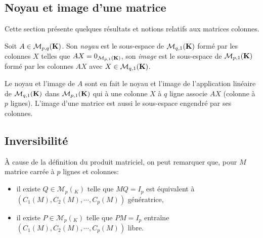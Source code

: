 \subsection{Noyau et image d'une matrice}
Cette section présente quelques résultats et notions relatifs aux matrices colonnes.
\begin{defi} 
Soit $A\in \mathcal{M}_{p,q}(\mathbf{K})$. Son \emph{noyau} est le sous-espace de $\mathcal{M}_{q,1}(\mathbf{K})$ formé par les colonnes $X$ telles que $AX = 0_{\mathcal{M}_{p,1}(\mathbf{K})}$, son \emph{image} est le sous-espace de $\mathcal{M}_{p,1}(\mathbf{K})$ formé par les colonnes $AX$ avec $X\in \mathcal{M}_{q,1}(\mathbf{K})$.
\end{defi}
Le noyau et l'image de $A$ sont en fait le noyau et l'image de l'application linéaire de $\mathcal{M}_{q,1}(\mathbf{K})$ dans $\mathcal{M}_{p,1}(\mathbf{K})$ qui à une colonne $X$ à $q$ ligne associe $AX$ (colonne à $p$ lignes). 
L'image d'une matrice est aussi le sous-espace engendré par ses colonnes.

\subsection{Inversibilité}
\`A cause de la définition du produit matriciel, on peut remarquer que, pour $M$ matrice carrée à $p$ lignes et colonnes:
\begin{itemize}
  \item il existe $Q\in \mathcal{M}_p(_K)$ telle que $MQ = I_p$ est équivalent à $(C_1(M),C_2(M),\cdots,C_p(M))$ génératrice,
  \item il existe $P\in \mathcal{M}_p(_K)$ telle que $PM = I_p$ entraîne $(C_1(M),C_2(M),\cdots,C_p(M))$ libre.
\end{itemize}

